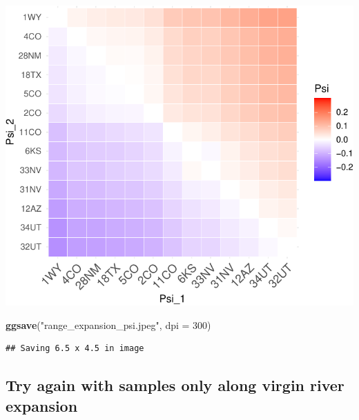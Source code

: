 \documentclass[]{article}
\newenvironment{Shaded}{\begin{snugshade}}{\end{snugshade}}
\newcommand{\KeywordTok}[1]{\textcolor[rgb]{0.13,0.29,0.53}{\textbf{#1}}}
\newcommand{\DataTypeTok}[1]{\textcolor[rgb]{0.13,0.29,0.53}{#1}}
\newcommand{\DecValTok}[1]{\textcolor[rgb]{0.00,0.00,0.81}{#1}}
\newcommand{\StringTok}[1]{\textcolor[rgb]{0.31,0.60,0.02}{#1}}
\newcommand{\CommentTok}[1]{\textcolor[rgb]{0.56,0.35,0.01}{\textit{#1}}}
\newcommand{\OperatorTok}[1]{\textcolor[rgb]{0.81,0.36,0.00}{\textbf{#1}}}
\newcommand{\NormalTok}[1]{#1}
\begin{document}
\includegraphics{range_expansion_files/figure-latex/psi-1.pdf}

\begin{Shaded}
\begin{Highlighting}[]
\KeywordTok{ggsave}\NormalTok{(}\StringTok{"range_expansion_psi.jpeg"}\NormalTok{, }\DataTypeTok{dpi =} \DecValTok{300}\NormalTok{)}
\end{Highlighting}
\end{Shaded}

\begin{verbatim}
## Saving 6.5 x 4.5 in image
\end{verbatim}

\subsection{Try again with samples only along virgin river
expansion}\label{try-again-with-samples-only-along-virgin-river-expansion}

\begin{Shaded}
\end{Shaded}
\end{document}
